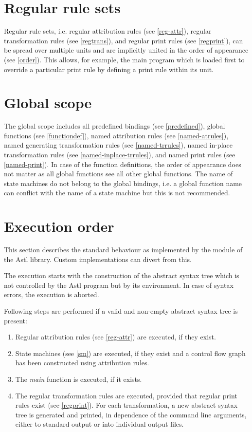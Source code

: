 \section{Regular rule sets}
Regular rule sets, i.e. regular attribution rules (see \ref{reg-attr}),
regular transformation rules (see \ref{regtrans}), and
regular print rules (see \ref{regprint}), can be spread over
multiple units and are implicitly united in the order of appearance
(see \ref{order}). This allows, for example, the main program which
is loaded first to override a particular print rule by defining
a print rule within its unit.

\section{Global scope}

The global scope includes all predefined bindings (see \ref{predefined}),
global functions (see \ref{functiondef}), named attribution rules
(see \ref{named-atrules}), named generating transformation rules (see
\ref{named-trrules}), named in-place transformation rules
(see \ref{named-inplace-trrules}), and named print rules
(see \ref{named-print}). In case of the function definitions,
the order of appearance does not matter as all global functions see all
other global functions.  The name of state machines do not belong to
the global bindings, i.e. a global function name can conflict with the
name of a state machine but this is not recommended.

\section{Execution order}\label{xorder}

This section describes the standard behaviour as implemented by
the  module of the Astl library. Custom implementations
can divert from this.

The execution starts with the construction of the abstract syntax tree
which is not controlled by the Astl program but by its environment.
In case of syntax errors, the execution is aborted.

Following steps are performed if a valid and non-empty
abstract syntax tree is present:

\begin{enumerate}
   \item Regular attribution rules (see \ref{reg-attr}) are executed,
      if they exist.
   \item State machines (see \ref{sm}) are executed, if they exist
      and a control flow graph has been constructed using attribution rules.
   \item The \textit{main} function is executed, if it exists.
   \item The regular transformation rules are executed, provided
      that regular print rules exist (see \ref{regprint}).
      For each transformation, a new abstract syntax tree is generated
      and printed, in dependence of the command line arguments, either
      to standard output or into individual output files.
\end{enumerate}

\endinput
